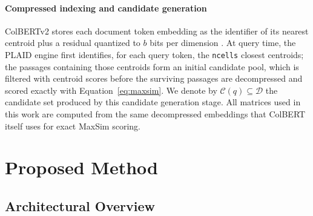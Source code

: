 \documentclass[preprint,5p,times,twocolumn,authoryear]{elsarticle}
\begin{document}
\paragraph{Compressed indexing and candidate generation}
ColBERTv2 stores each document token embedding as the identifier of its nearest centroid plus a residual quantized to $b$ bits per dimension \citep{v2}. At query time, the PLAID engine \citep{santhanam2022plaid} first identifies, for each query token, the \texttt{ncells} closest centroids; the passages containing those centroids form an initial candidate pool, which is filtered with centroid scores before the surviving passages are decompressed and scored exactly with Equation~\eqref{eq:maxsim}. We denote by $\mathcal{C}(q)\subseteq\mathcal{D}$ the candidate set produced by this candidate generation stage. All matrices used in this work are computed from the same decompressed embeddings that ColBERT itself uses for exact MaxSim scoring.

\section{Proposed Method}
\label{sec:method}

\subsection{Architectural Overview}
\label{sec:arch}
\end{document}
